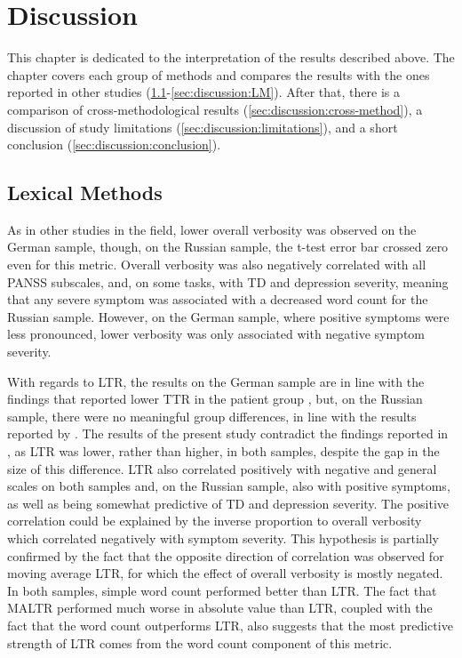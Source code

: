 
\chapter{Discussion} %
\label{chap:5:discussion}

This chapter is dedicated to the interpretation of the results described above. The chapter covers each group of methods and compares the results with the ones reported in other studies (\ref{sec:discussion:lexical}-\ref{sec:discussion:LM}). After that, there is a comparison of cross-methodological results (\ref{sec:discussion:cross-method}), a discussion of study limitations (\ref{sec:discussion:limitations}), and a short conclusion (\ref{sec:discussion:conclusion}).

\section{Lexical Methods}
\label{sec:discussion:lexical}

As in other studies in the field, lower overall verbosity was observed on the German sample, though, on the Russian sample, the t-test error bar crossed zero even for this metric. Overall verbosity was also negatively correlated with all PANSS subscales, and, on some tasks, with TD and depression severity, meaning that any severe symptom was associated with a decreased word count for the Russian sample. However, on the German sample, where positive symptoms were less pronounced, lower verbosity was only associated with negative symptom severity. 

With regards to LTR, the results on the German sample are in line with the findings that reported lower TTR in the patient group \citep{willits2018evidence, aich2022towards, minor2023automated}, but, on the Russian sample, there were no meaningful group differences, in line with the results reported by \citet{hitczenko2021understanding, jeong2023exploring, schneider2023syntactic}. The results of the present study contradict the findings reported in \citet{ziv2022morphological}, as LTR was lower, rather than higher, in both samples, despite the gap in the size of this difference. LTR also correlated positively with negative and general scales on both samples and, on the Russian sample, also with positive symptoms, as well as being somewhat predictive of TD and depression severity. The positive correlation could be explained by the inverse proportion to overall verbosity which correlated negatively with symptom severity. This hypothesis is partially confirmed by the fact that the opposite direction of correlation was observed for moving average LTR, for which the effect of overall verbosity is mostly negated. In both samples, simple word count performed better than LTR. The fact that MALTR performed much worse in absolute value than LTR, coupled with the fact that the word count outperforms LTR, also suggests that the most predictive strength of LTR comes from the word count component of this metric.


